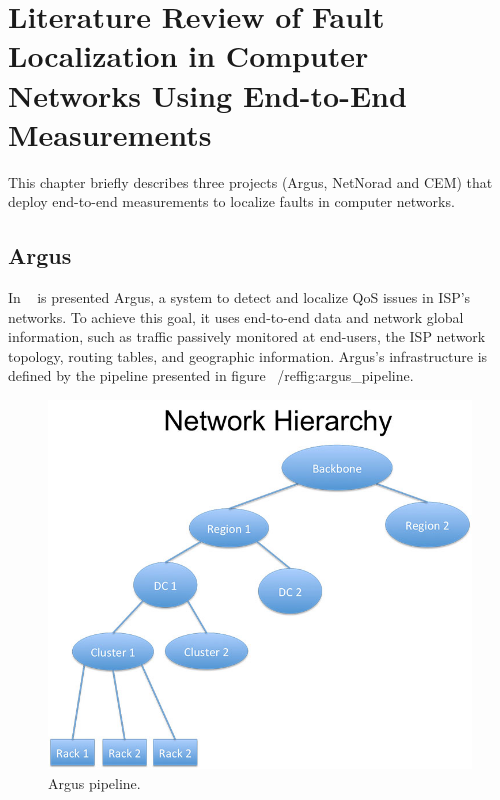 \chapter{Literature Review of Fault Localization in Computer Networks Using
End-to-End Measurements}

This chapter briefly describes three projects (Argus, NetNorad and CEM)
that deploy end-to-end measurements to localize faults in computer networks.

\section{Argus}

In
~\cite{argus_end_to_end_service_anomaly_detection_and_localization_from_an_isps_point_of_view}
is presented Argus, a system to
detect and localize QoS issues in ISP's networks. To achieve this goal, it uses
end-to-end data and network global information, such as
traffic passively monitored at end-users, the ISP network topology,
routing tables, and geographic information. Argus's infrastructure is defined by
the pipeline presented in figure ~/ref{fig:argus_pipeline}.

\begin{figure}[H]
    \centering
    \includegraphics[width=1.0\textwidth]{./figures/literature_review/argus_pipeline.jpg}
    \caption{Argus pipeline.}
    \label{fig:argus_pipeline}
\end{figure}%

